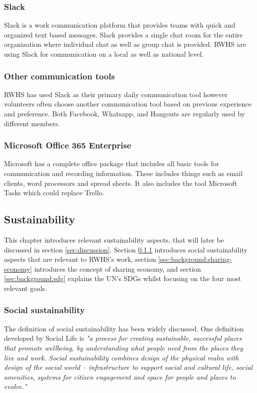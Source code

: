 \subsubsection{Slack}
Slack is a work communication platform that provides teams with quick and organized text based messages. Slack provides a single chat room for the entire organization where individual chat as well as group chat is provided. RWHS are using Slack for communication on a local as well as national level. \cite{SlackAboutSlack}

\subsubsection{Other communication tools}
RWHS has used Slack as their primary daily communication tool however volunteers often choose another communication tool based on previous experience and preference. Both Facebook, Whatsapp, and Hangouts are regularly used by different members.

\subsubsection{Microsoft Office 365 Enterprise}
\label{sec:background:microsoft-office}
Microsoft has a complete office package that includes all basic tools for communication and recording information. These includes things such as email clients, word processors and spread sheets. It also includes the tool Microsoft Tasks which could replace Trello. \cite{MicrosoftMicrosoftNonprofits}

\subsection{Sustainability}
\label{sec:background:sustainability}
This chapter introduces relevant sustainability aspects, that will later be discussed in section \ref{sec:discussion}. Section \ref{sec:background:social-sustainability} introduces social sustainability aspects that are relevant to RWHS's work, section \ref{sec:background:sharing-economy} introduces the concept of sharing economy, and section \ref{sec:background:sdg} explains the UN's SDGs whilst focusing on the four most relevant goals.

\subsubsection{Social sustainability}
\label{sec:background:social-sustainability}
The definition of social sustainability has been widely discussed. One definition developed by Social Life is  \textit{"a process for creating sustainable, successful places that promote wellbeing, by understanding what people need from the places they live and work. Social sustainability combines design of the physical realm with design of the social world – infrastructure to support social and cultural life, social amenities, systems for citizen engagement and space for people and places to evolve."} \cite{Woodcraf}

